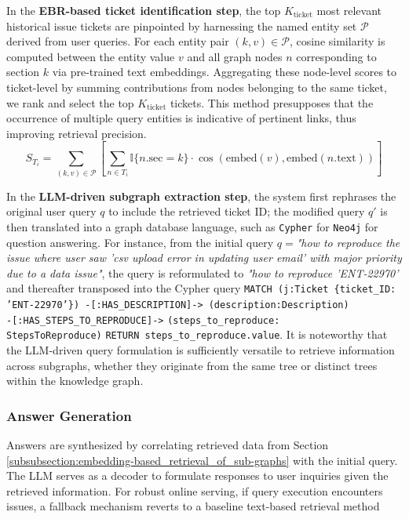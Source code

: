\documentclass[sigconf]{acmart}
\begin{document}
In the \textbf{EBR-based ticket identification step}, the top \(K_{\text{ticket}}\) most relevant historical issue tickets are pinpointed by harnessing the named entity set \(\mathcal{P}\) derived from user queries. For each entity pair \((k,v) \in \mathcal{P}\), cosine similarity is computed between the entity value \(v\) and all graph nodes \(n\) corresponding to section \(k\) via pre-trained text embeddings. Aggregating these node-level scores to ticket-level by summing contributions from nodes belonging to the same ticket, we rank and select the top \(K_{\text{ticket}}\) tickets. This method presupposes that the occurrence of multiple query entities is indicative of pertinent links, thus improving retrieval precision.
\[S_{T_i} = \sum_{(k,v) \in \mathcal{P}} \left[ \sum_{n \in T_i} \mathbb{I}\{n.\text{sec} = k\} \cdot \cos(\text{embed}(v), \text{embed}(n.\text{text}))\right]\]

In the \textbf{LLM-driven subgraph extraction step}, the system first rephrases the original user query \(q\) to include the retrieved ticket ID; the modified query \(q'\) is then translated into a graph database language, such as \texttt{Cypher} for \texttt{Neo4j} for question answering. For instance, from the initial query \(q=\)\textit{"how to reproduce the issue where user saw 'csv upload error in updating user email' with major priority due to a data issue"}, the query is reformulated to \textit{"how to reproduce 'ENT-22970'} and thereafter transposed into the Cypher query \texttt{MATCH (j:Ticket \{ticket\_ID: 'ENT-22970'\}) -[:HAS\_DESCRIPTION]-> (description:Description) \\
-[:HAS\_STEPS\_TO\_REPRODUCE]->} \texttt{(steps\_to\_reproduce:\\ StepsToReproduce)} \texttt{RETURN steps\_to\_reproduce.value}. It is noteworthy that the LLM-driven query formulation is sufficiently versatile to retrieve information across subgraphs, whether they originate from the same tree or distinct trees within the knowledge graph.



\subsubsection{Answer Generation}

Answers are synthesized by correlating retrieved data from Section \ref{subsubsection:embedding-based_retrieval_of_sub-graphs} with the initial query. The LLM serves as a decoder to formulate responses to user inquiries given the retrieved information. For robust online serving, if query execution encounters issues, a fallback mechanism reverts to a baseline text-based retrieval method
\end{document}

